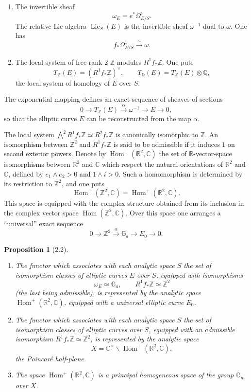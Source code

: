 \documentclass[10pt]{article}
\newcommand{\C}{\mathbb C}
\newcommand{\Q}{\mathbb Q}
\newcommand{\R}{\mathbb R}
\newcommand{\Z}{\mathbb Z}
\newcommand{\Ga}{\mathbb G_a}
\newcommand{\Gm}{\mathbb G_m}
\newcommand{\Hom}{\operatorname{Hom}}
\newcommand{\Lie}{\operatorname{Lie}}
\newtheorem*{proposition}{Proposition}
\begin{document}
\begin{enumerate}[label=(\alph*)]
\item The invertible sheaf
\[
\omega_E=e^*\Omega^1_{E/S}.
\]
The relative Lie algebra $\Lie_S(E)$ is the invertible sheaf $\omega^{-1}$ dual to $\omega$.
One has
\[
f_*\Omega^1_{E/S}\xrightarrow{\sim}\omega .
\]

\item The local system of free rank-$2$ $\Z$-modules $R^1f_*\Z$. One puts
\[
T_\Z(E)=(R^1f_*\Z)^\vee,\qquad
T_\Q(E)=T_\Z(E)\otimes\Q,
\]
the local system of homology of $E$ over $S$.
\end{enumerate}

The exponential mapping defines an exact sequence of sheaves of sections
\[
0\longrightarrow T_\Z(E)\xrightarrow{\alpha}\omega^{-1}\longrightarrow E\longrightarrow 0,
\]
so that the elliptic curve $E$ can be reconstructed from the map $\alpha$.

The local system $\bigwedge^2 R^1f_*\Z\simeq R^2f_*\Z$ is canonically isomorphic
to $\Z$. An isomorphism between $\Z^2$ and $R^1f_*\Z$ is said to be admissible if it
induces $1$ on second exterior powers. Denote by $\Hom^+(\R^2,\C)$ the set of
$\R$-vector-space isomorphisms between $\R^2$ and $\C$ which respect the natural
orientations of $\R^2$ and $\C$, defined by $e_1\wedge e_2>0$ and $1\wedge i>0$.
Such a homomorphism is determined by its restriction to $\Z^2$, and one puts
\[
\Hom^+(\Z^2,\C)=\Hom^+(\R^2,\C).
\]
This space is equipped with the complex structure obtained from its inclusion in the
complex vector space $\Hom(\Z^2,\C)$. Over this space one arranges a ``universal'' exact
sequence
\[
0\longrightarrow \Z^2\xrightarrow{\alpha}\Ga\longrightarrow E_0\longrightarrow 0.
\]

\begin{proposition}[2.2]
\leavevmode
\begin{enumerate}[label=(\roman*)]
\item The functor which associates with each analytic space $S$ the set of isomorphism
classes of elliptic curves $E$ over $S$, equipped with isomorphisms
\[
\omega_E\simeq \Ga,\qquad R^1f_*\Z\simeq \Z^2
\]
(the last being admissible), is represented by the analytic space $\Hom^+(\R^2,\C)$,
equipped with a universal elliptic curve $E_0$.

\item The functor which associates with each analytic space $S$ the set of isomorphism
classes of elliptic curves over $S$, equipped with an admissible isomorphism
$R^1f_*\Z\simeq \Z^2$, is represented by the analytic space
\[
X=\C^\times\backslash\Hom^+(\R^2,\C),
\]
the Poincaré half-plane.

\item The space $\Hom^+(\R^2,\C)$ is a principal homogeneous space of the group
$\Gm$ over $X$.
\end{enumerate}
\end{proposition}
\end{document}
